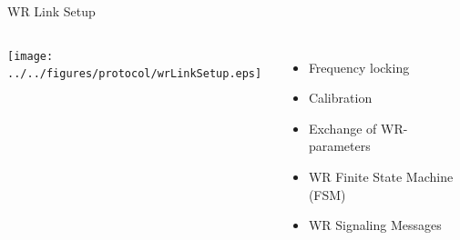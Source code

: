 \documentclass[compress,red]{beamer}
\begin{document}
\begin{frame}{WR Link Setup }

  \begin{columns}[c]

      \begin{center}
      \texttt{[image: ../../figures/protocol/wrLinkSetup.eps]}
      \end{center}



      \begin{itemize}
	\item Frequency locking
	\item Calibration
	\item Exchange of WR-parameters
	\item WR Finite State Machine (FSM)
	\item WR Signaling Messages
      \end{itemize}

  \end{columns}

\end{frame}
% 
% 
% 
\end{document}
